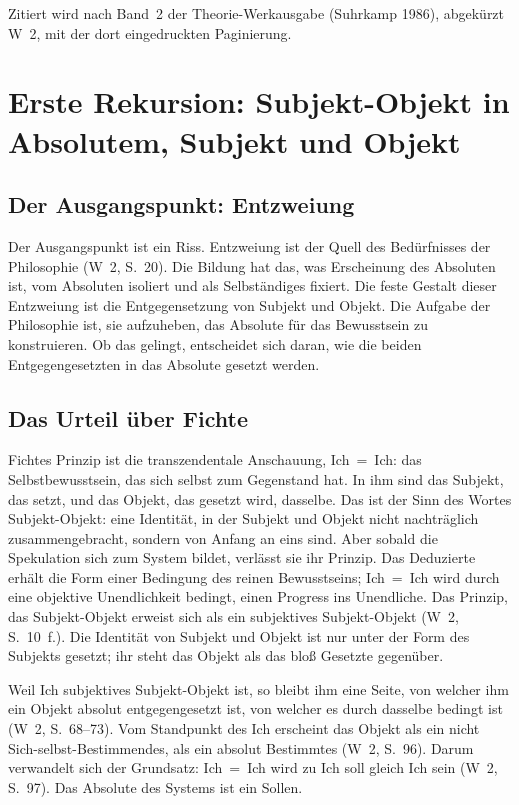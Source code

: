 \documentclass[11pt,a4paper]{article}
\newcommand{\SO}{Subjekt-Objekt}
\newcommand{\Werke}[1]{(W~2, S.~#1)}
\begin{document}
Zitiert wird nach Band~2 der Theorie-Werkausgabe (Suhrkamp 1986), abgekürzt W~2, mit der dort eingedruckten Paginierung.

\section{Erste Rekursion: \SO{} in Absolutem, Subjekt und Objekt}

\subsection{Der Ausgangspunkt: Entzweiung}

Der Ausgangspunkt ist ein Riss. \glqq Entzweiung ist der Quell des Bedürfnisses der Philosophie\grqq{} \Werke{20}. Die Bildung hat das, was Erscheinung des Absoluten ist, vom Absoluten isoliert und als Selbständiges fixiert. Die feste Gestalt dieser Entzweiung ist die Entgegensetzung von Subjekt und Objekt. Die Aufgabe der Philosophie ist, sie aufzuheben, das Absolute für das Bewusstsein zu konstruieren. Ob das gelingt, entscheidet sich daran, wie die beiden Entgegengesetzten in das Absolute gesetzt werden.

\subsection{Das Urteil über Fichte}

Fichtes Prinzip ist die transzendentale Anschauung, Ich~=~Ich: das Selbstbewusstsein, das sich selbst zum Gegenstand hat. In ihm sind das Subjekt, das setzt, und das Objekt, das gesetzt wird, dasselbe. Das ist der Sinn des Wortes \SO{}: eine Identität, in der Subjekt und Objekt nicht nachträglich zusammengebracht, sondern von Anfang an eins sind. Aber sobald die Spekulation sich zum System bildet, verlässt sie ihr Prinzip. Das Deduzierte erhält die Form einer Bedingung des reinen Bewusstseins; Ich~=~Ich wird durch eine objektive Unendlichkeit bedingt, einen Progress ins Unendliche. \glqq Das Prinzip, das \SO{} erweist sich als ein subjektives \SO{}\grqq{} \Werke{10~f.}. Die Identität von Subjekt und Objekt ist nur unter der Form des Subjekts gesetzt; ihr steht das Objekt als das bloß Gesetzte gegenüber.

\glqq Weil Ich subjektives \SO{} ist, so bleibt ihm eine Seite, von welcher ihm ein Objekt absolut entgegengesetzt ist, von welcher es durch dasselbe bedingt ist\grqq{} \Werke{68--73}. Vom Standpunkt des Ich erscheint das Objekt \glqq als ein nicht Sich-selbst-Bestimmendes, als ein absolut Bestimmtes\grqq{} \Werke{96}. Darum verwandelt sich der Grundsatz: Ich~=~Ich wird zu \glqq Ich soll gleich Ich sein\grqq{} \Werke{97}. Das Absolute des Systems ist ein Sollen.
\end{document}
